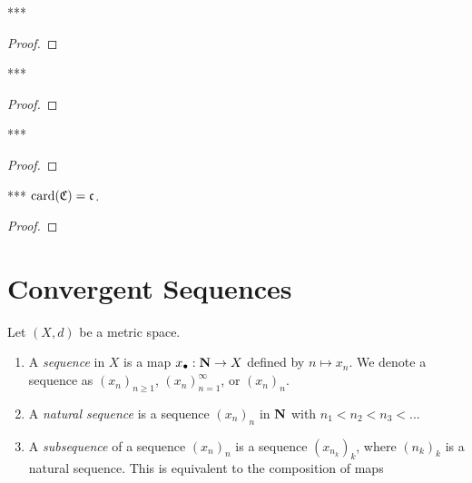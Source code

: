     \begin{lemma}***
        
    \end{lemma}
        \begin{proof}
            
        \end{proof}

    \begin{lemma}***
    
    \end{lemma}
        \begin{proof}
            
        \end{proof}

    \begin{lemma}***

    \end{lemma}
        \begin{proof}
            
        \end{proof}

    \begin{proposition}***
        $\operatorname{card}(\mathfrak{C}) = \mathfrak{c}$.
    \end{proposition}
        \begin{proof}
            
        \end{proof}

\section{Convergent Sequences}\label{sec:conv-seq}
    \begin{definition}
        Let $(X,d)$ be a metric space.
        \begin{enumerate}[label = (\arabic*),itemsep=1pt,topsep=3pt]
            \item A \textit{sequence} in $X$ is a map $x_{\bullet}:\mathbf{N} \rightarrow X$ defined by $n \mapsto x_n$. We denote a sequence as $(x_n)_{n \geq 1}$, $(x_n)_{n = 1}^\infty$, or $(x_n)_n$.
            
            \item A \textit{natural sequence} is a sequence $(x_n)_n$ in $\mathbf{N}$ with $n_1 < n_2 < n_3 < ...$
            
            \item A \textit{subsequence} of a sequence $(x_n)_n$ is a sequence $(x_{n_k})_k$, where $(n_k)_k$ is a natural sequence. This is equivalent to the composition of maps
        \end{enumerate}
    \end{definition}

